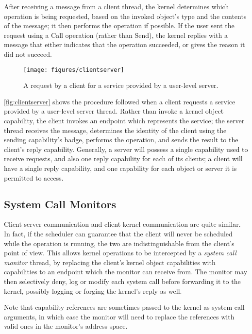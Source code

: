After receiving a message from a client thread, the kernel determines which
operation is being requested, based on the invoked object's type and the
contents of the message; it then performs the operation if possible. If the user sent the request using a Call operation (rather than Send), the kernel replies with a message that either indicates that the operation succeeded, or gives the reason it did not succeed.

\begin{figure}
\centering \texttt{[image: figures/clientserver]}
\caption{A request by a client for a service provided by a user-level server.}
\label{fig:clientserver}
\end{figure}

\autoref{fig:clientserver} shows the procedure followed when a client
requests a service provided by a user-level server thread. Rather than invoke
a kernel object capability, the client invokes an endpoint which represents
the service; the server thread receives the message, determines the identity
of the client using the sending capability's badge, performs the operation,
and sends the result to the client's reply capability. Generally, a server
will possess a single capability used to receive requests, and also one reply
capability for each of its clients; a client will have a single reply
capability, and one capability for each object or server it is permitted to
access.

\subsection{System Call Monitors}\label{sec:sel4:monitors}

Client-server communication and client-kernel communication are quite similar.
In fact, if the scheduler can guarantee that the client will never be
scheduled while the operation is running, the two are indistinguishable from
the client's point of view. This allows kernel operations to be intercepted by
a \emph{system call monitor} thread, by replacing the client's kernel object
capabilities with capabilities to an endpoint which the monitor can receive
from. The monitor may then selectively deny, log or modify each system call
before forwarding it to the kernel, possibly logging or forging the kernel's
reply as well.

Note that capability references are sometimes passed to the kernel as system
call arguments, in which case the monitor will need to replace the references
with valid ones in the monitor's address space.

